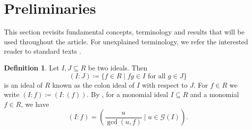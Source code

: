 \documentclass[11pt,reqno,a4paper]{amsart}
\theoremstyle{definition}
\newtheorem{definition}[theorem]{Definition}
\begin{document}
\section{Preliminaries}

\noindent This section revisits fundamental concepts, terminology and results that will be used throughout the article. For unexplained terminology, we refer the interested reader to standard texts  \cite{HerzogHibi11} \cite{HunekeSwanson06}.

\begin{definition}
Let \(I,J\subseteq R\) be two ideals. Then 
\[
(I:J)\coloneqq \{f\in R\mid fg\in I \text{ for all } g\in J\}
\]
is an ideal of \(R\) known as the colon ideal of \(I\) with respect to \(J\). For \(f\in R\) we write \((I:f)\coloneqq (I:(f))\). By \cite[Proposition 1.2.2]{HerzogHibi11}, for a monomial ideal \(I\subseteq R\) and a monomial \(f\in R\), we have
\[
(I:f) = \left(\frac{u}{\gcd(u,f)}\mid u\in \mathcal{G}(I)\right).
\]
\end{definition}
\end{document}
